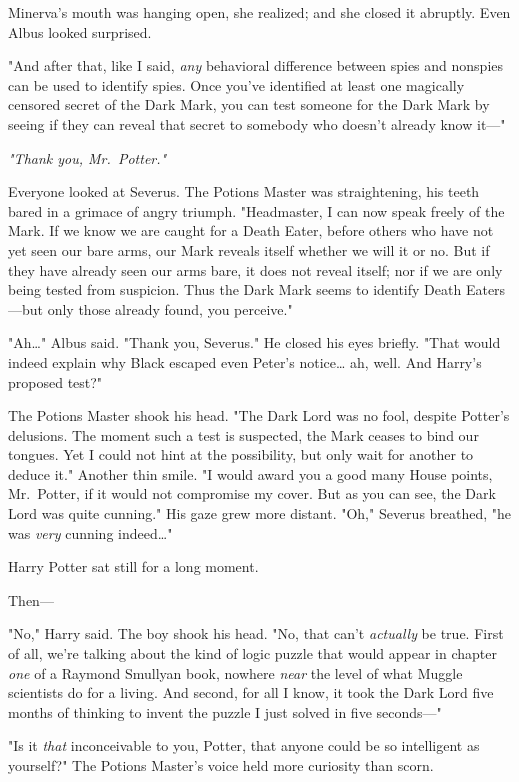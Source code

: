Minerva's mouth was hanging open, she realized; and she closed it abruptly. Even Albus looked surprised.

"And after that, like I said, \emph{any} behavioral difference between spies and nonspies can be used to identify spies. Once you've identified at least one magically censored secret of the Dark Mark, you can test someone for the Dark Mark by seeing if they can reveal that secret to somebody who doesn't already know it---"

\emph{"Thank you, Mr.~Potter."}

Everyone looked at Severus. The Potions Master was straightening, his teeth bared in a grimace of angry triumph. "Headmaster, I can now speak freely of the Mark. If we know we are caught for a Death Eater, before others who have not yet seen our bare arms, our Mark reveals itself whether we will it or no. But if they have already seen our arms bare, it does not reveal itself; nor if we are only being tested from suspicion. Thus the Dark Mark seems to identify Death Eaters---but only those already found, you perceive."

"Ah{\ldots}" Albus said. "Thank you, Severus." He closed his eyes briefly. "That would indeed explain why Black escaped even Peter's notice{\ldots} ah, well. And Harry's proposed test?"

The Potions Master shook his head. "The Dark Lord was no fool, despite Potter's delusions. The moment such a test is suspected, the Mark ceases to bind our tongues. Yet I could not hint at the possibility, but only wait for another to deduce it." Another thin smile. "I would award you a good many House points, Mr.~Potter, if it would not compromise my cover. But as you can see, the Dark Lord was quite cunning." His gaze grew more distant. "Oh," Severus breathed, "he was \emph{very} cunning indeed{\ldots}"

Harry Potter sat still for a long moment.

Then---

"No," Harry said. The boy shook his head. "No, that can't \emph{actually} be true. First of all, we're talking about the kind of logic puzzle that would appear in chapter \emph{one} of a Raymond Smullyan book, nowhere \emph{near} the level of what Muggle scientists do for a living. And second, for all I know, it took the Dark Lord five months of thinking to invent the puzzle I just solved in five seconds---"

"Is it \emph{that} inconceivable to you, Potter, that anyone could be so intelligent as yourself?" The Potions Master's voice held more curiosity than scorn.

